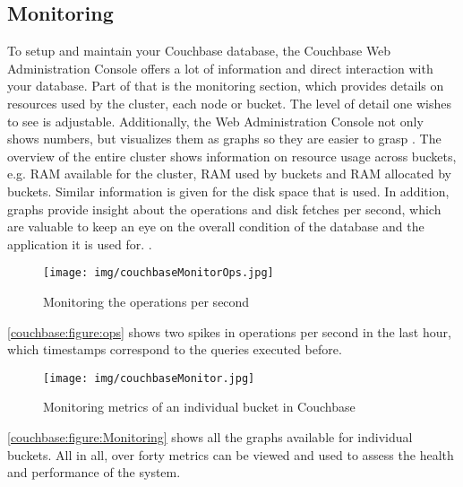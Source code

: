 \subsection{Monitoring}
To setup and maintain your Couchbase database, the Couchbase Web Administration Console offers a lot of information and direct interaction with your database. Part of that is the monitoring section, which provides details on resources used by the cluster, each node or bucket. The level of detail one wishes to see is adjustable. Additionally, the Web Administration Console not only shows numbers, but visualizes them as graphs so they are easier to grasp \parencite{getStarted}. The overview of the entire cluster shows information on resource usage across buckets, e.g. RAM available for the cluster, RAM used by buckets and RAM allocated by buckets. Similar information is given for the disk space that is used. In addition, graphs provide insight about the operations and disk fetches per second, which are valuable to keep an eye on the overall condition of the database and the application it is used for. \parencite{proCouchbaseServer}.

\begin{figure}
    \centering
    \texttt{[image: img/couchbaseMonitorOps.jpg]}
    \caption{Monitoring the operations per second}
    \label{couchbase:figure:ops}
\end{figure}

\autoref{couchbase:figure:ops} shows two spikes in operations per second in the last hour, which timestamps correspond to the queries executed before.

\begin{figure}[H]
    \centering
    \texttt{[image: img/couchbaseMonitor.jpg]}
    \caption{Monitoring metrics of an individual bucket in Couchbase}
    \label{couchbase:figure:Monitoring}
\end{figure}

\autoref{couchbase:figure:Monitoring} shows all the graphs available for individual buckets. All in all, over forty metrics can be viewed and used to assess the health and performance of the system.

